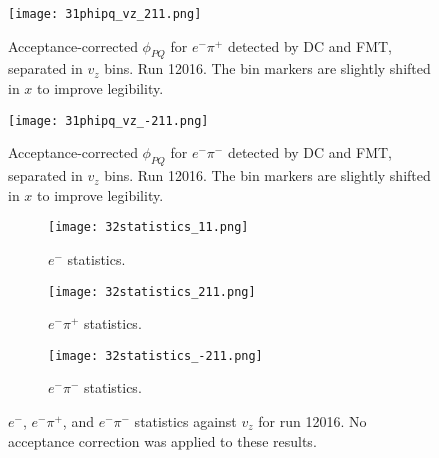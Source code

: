     \begin{figure}
        \centering
        \texttt{[image: 31phipq\_vz\_211.png]}
        \caption[Acceptance-corrected $\phi_{PQ}$ for $e^-\pi^+$ separated in $v_z$ bins]
        {Acceptance-corrected $\phi_{PQ}$ for $e^-\pi^+$ detected by DC and FMT, separated in $v_z$ bins.
        Run 12016.
        The bin markers are slightly shifted in $x$ to improve legibility.}
        \label{fig::14.31::phipq_211_vz}
    \end{figure}

    \begin{figure}
        \centering
        \texttt{[image: 31phipq\_vz\_-211.png]}
        \caption[Acceptance-corrected $\phi_{PQ}$ for $e^-\pi^-$ separated in $v_z$ bins]
        {Acceptance-corrected $\phi_{PQ}$ for $e^-\pi^-$ detected by DC and FMT, separated in $v_z$ bins.
        Run 12016.
        The bin markers are slightly shifted in $x$ to improve legibility.}
        \label{fig::14.31::phipq_-211_vz}
    \end{figure}

    \begin{figure}
        \centering
        \begin{subfigure}[b]{\textwidth}
            \centering
            \texttt{[image: 32statistics\_11.png]}
            \caption{$e^-$ statistics.}
            \label{fig::14.32::statistics_11}
        \end{subfigure}
        \centering
        \begin{subfigure}[b]{0.49\textwidth}
            \centering
            \texttt{[image: 32statistics\_211.png]}
            \caption{$e^-\pi^+$ statistics.}
            \label{fig::14.32::statistics_211}
        \end{subfigure}
        \hfill
        \begin{subfigure}[b]{0.49\textwidth}
            \centering
            \texttt{[image: 32statistics\_-211.png]}
            \caption{$e^-\pi^-$ statistics.}
            \label{fig::14.32::statistics_-211}
        \end{subfigure}
        \caption[Statistics for $e^-$, $e^-\pi^+$, and $e^-\pi^-$ against $v_z$]
        {$e^-$, $e^-\pi^+$, and $e^-\pi^-$ statistics against $v_z$ for run 12016.
        No acceptance correction was applied to these results.}
        \label{fig::14.32::statistics}
    \end{figure}
